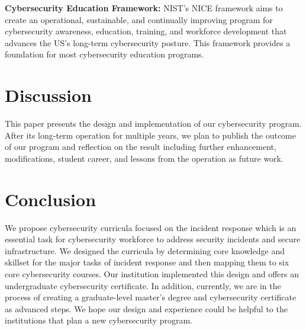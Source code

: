 \documentclass{article}
\begin{document}
\textbf{Cybersecurity Education Framework:}
NIST's NICE framework \cite{6226542} 
aims to create an operational, sustainable, and continually improving program for cybersecurity awareness, education, training, and workforce development that advances the US’s long-term cybersecurity posture. This framework provides a foundation for most cybersecurity education programs.








 






\section{Discussion}
\label{sec:discussion}

This paper presents the design and implementation of our cybersecurity program. After its long-term operation for multiple years, we plan to publish the outcome of our program and reflection on the result including further enhancement, modifications, student career, and lessons from the operation as future work.

\section{Conclusion}
\label{sec:conclusion}

We propose cybersecurity curricula focused on the incident response which is an essential task for cybersecurity workforce to address security incidents and secure infrastructure. We designed the curricula by determining core knowledge and skillset for the major tasks of incident response and then mapping them to six core cybersecurity courses. Our institution implemented this design and offers an undergraduate cybersecurity certificate. In addition, currently, we are in the process of creating a graduate-level master's degree and cybersecurity certificate as advanced steps. We hope our design and experience could be helpful to the institutions that plan a new cybersecurity program.


\medskip



\end{document}
